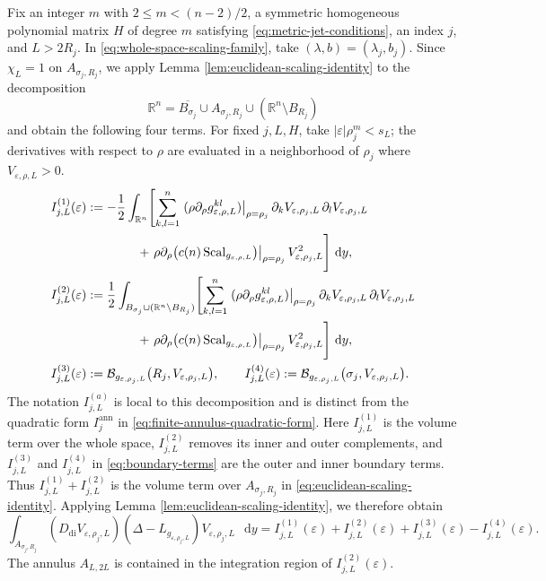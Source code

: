 \documentclass[11pt]{article}
\numberwithin{equation}{section}
\theoremstyle{remark}
\newcommand{\R}{\mathbb R}
\newcommand{\eps}{\varepsilon}
\newcommand{\dd}{\mathop{}\!\mathrm{d}}
\begin{document}
Fix an integer \(m\) with \(2\le m<(n-2)/2\), a symmetric homogeneous
polynomial matrix \(H\) of degree \(m\) satisfying
\eqref{eq:metric-jet-conditions}, an index \(j\), and
\(L>2R_j\). In \eqref{eq:whole-space-scaling-family}, take
\((\lambda,b)=(\lambda_j,b_j)\). Since \(\chi_L=1\) on
\(A_{\sigma_j,R_j}\), {we apply
Lemma  \ref{lem:euclidean-scaling-identity} to the decomposition}
\[
 \R^n=\overline{B_{\sigma_j}}\cup A_{\sigma_j,R_j}
 \cup(\R^n\setminus B_{R_j})
\]
{and obtain the following four terms.} For fixed \(j,L,H\), take
\(|\eps|\rho_j^m<s_L\); the derivatives with respect to \(\rho\) are evaluated in a
neighborhood of \(\rho_j\) where \(V_{\eps,\rho,L}>0\).
\begin{subequations}\label{eq:finite-to-whole-space-terms}
\begin{align}
I_{j,L}^{(1)}(\eps)
&:=-\frac12\int_{\R^n}\Biggl[
\sum_{k,l=1}^n
\left.(\rho\partial_\rho g_{\eps,\rho,L}^{kl})\right|_{\rho=\rho_j}
\partial_kV_{\eps,\rho_j,L}\,
\partial_lV_{\eps,\rho_j,L}
\notag\\
&\qquad\qquad
+\left.\rho\partial_\rho
\bigl(c(n)\operatorname{Scal}_{g_{\eps,\rho,L}}\bigr)
\right|_{\rho=\rho_j}
V_{\eps,\rho_j,L}^2
\Biggr]\,\dd y,
\\
I_{j,L}^{(2)}(\eps)
&:=\frac12
\int_{B_{\sigma_j}\cup(\R^n\setminus B_{R_j})}\Biggl[
\sum_{k,l=1}^n
\left.(\rho\partial_\rho g_{\eps,\rho,L}^{kl})
\right|_{\rho=\rho_j}
\partial_kV_{\eps,\rho_j,L}\,
\partial_lV_{\eps,\rho_j,L}
\notag\\
&\qquad\qquad
+\left.\rho\partial_\rho
\bigl(c(n)\operatorname{Scal}_{g_{\eps,\rho,L}}\bigr)
\right|_{\rho=\rho_j}
V_{\eps,\rho_j,L}^2
\Biggr]\,\dd y,
\label{eq:complementary-volume-term}
\\
I_{j,L}^{(3)}(\eps)
&:=\mathcal B_{g_{\eps,\rho_j,L}}
\bigl(R_j,V_{\eps,\rho_j,L}\bigr),
\qquad
I_{j,L}^{(4)}(\eps)
:=\mathcal B_{g_{\eps,\rho_j,L}}
\bigl(\sigma_j,V_{\eps,\rho_j,L}\bigr).
\label{eq:boundary-terms}
\end{align}
\end{subequations}
The notation \(I_{j,L}^{(a)}\) is local to this decomposition and is distinct
from the quadratic form \(I_j^{\mathrm{ann}}\) in
\eqref{eq:finite-annulus-quadratic-form}.
{Here \(I_{j,L}^{(1)}\) is the volume term over the whole space,
\(I_{j,L}^{(2)}\) removes its inner and outer complements, and
\(I_{j,L}^{(3)}\) and \(I_{j,L}^{(4)}\) in \eqref{eq:boundary-terms} are the outer and inner boundary
terms. Thus \(I_{j,L}^{(1)}+I_{j,L}^{(2)}\) is the volume term over
\(A_{\sigma_j,R_j}\) in \eqref{eq:euclidean-scaling-identity}.}
{Applying Lemma  \ref{lem:euclidean-scaling-identity}, we
therefore obtain}
 {
\[
 \int_{A_{\sigma_j,R_j}}
 (D_{\mathrm{di}}V_{\eps,\rho_j,L})
 (\Delta-L_{g_{\eps,\rho_j,L}})V_{\eps,\rho_j,L}\,\dd y
 =I_{j,L}^{(1)}(\eps)+I_{j,L}^{(2)}(\eps)
 +I_{j,L}^{(3)}(\eps)-I_{j,L}^{(4)}(\eps).
\]
}
The annulus \(A_{L,2L}\) is contained in the integration region of
\(I_{j,L}^{(2)}(\eps)\).
\end{document}

